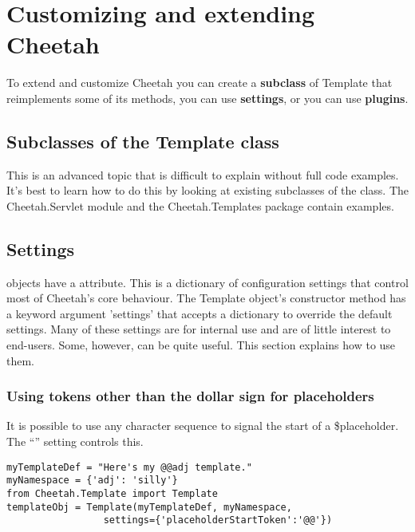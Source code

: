 \section{Customizing and extending Cheetah}
\label{customizing}

To extend and customize Cheetah you can create a {\bf subclass} of Template that
reimplements some of its methods, you can use {\bf settings}, or you can use
{\bf plugins}.

\subsection{Subclasses of the Template class}

This is an advanced topic that is difficult to explain without full code
examples.  It's best to learn how to do this by looking at existing subclasses
of the  class.  The Cheetah.Servlet module and the
Cheetah.Templates package contain examples.


\subsection{Settings}

 objects have a  attribute. This is a dictionary of
configuration settings that control most of Cheetah's core behaviour.  The
Template object's constructor method has a keyword argument 'settings' that
accepts a dictionary to override the default settings.  Many of these settings
are for internal use and are of little interest to end-users.  Some, however,
can be quite useful.  This section explains how to use them.

\subsubsection{Using tokens other than the dollar sign for placeholders}

It is possible to use any character sequence to signal the start of a
\$placeholder.  The ``'' setting controls this.

\begin{verbatim}
myTemplateDef = "Here's my @@adj template."
myNamespace = {'adj': 'silly'}
from Cheetah.Template import Template
templateObj = Template(myTemplateDef, myNamespace, 
                 settings={'placeholderStartToken':'@@'})
\end{verbatim}

